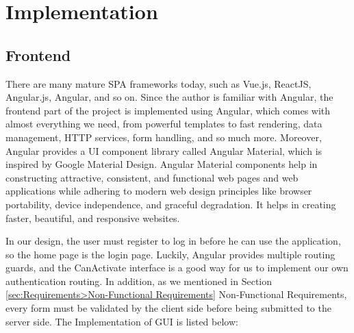 \section{Implementation}
\label{sec:Implementation}

\subsection{Frontend}
There are many mature SPA frameworks today, such as Vue.js, ReactJS, Angular.js, Angular, and so on. Since the author is familiar with Angular, the frontend part of the project is implemented using Angular, which comes with almost everything we need, from powerful templates to fast rendering, data management, HTTP services, form handling, and so much more. Moreover, Angular provides a UI component library called Angular Material,
which is inspired by Google Material Design. Angular Material components help in constructing attractive, consistent, and functional web pages and web applications while adhering to modern web design principles like browser portability, device independence, and graceful degradation. It helps in creating faster, beautiful, and responsive websites.

In our design, the user must register to log in before he can use the application, so the home page is the login page. Luckily, Angular provides multiple routing guards, and the CanActivate interface is a good way for us to implement our own authentication routing. In addition, as we mentioned in Section \ref{sec:Requirements>Non-Functional Requirements} Non-Functional Requirements, every form must be validated by the client side before being submitted to the server side. The Implementation of GUI is listed below:

